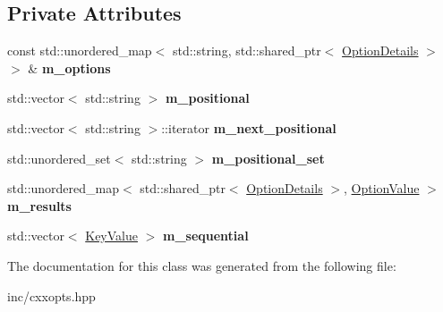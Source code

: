 \subsection*{Private Attributes}
\begin{DoxyCompactItemize}
\item 
const std\+::unordered\+\_\+map$<$ std\+::string, std\+::shared\+\_\+ptr$<$ \hyperlink{classcxxopts_1_1OptionDetails}{Option\+Details} $>$ $>$ \& {\bfseries m\+\_\+options}\hypertarget{classcxxopts_1_1ParseResult_a83d56d2c1c32704ba5218db38058d3be}{}\label{classcxxopts_1_1ParseResult_a83d56d2c1c32704ba5218db38058d3be}

\item 
std\+::vector$<$ std\+::string $>$ {\bfseries m\+\_\+positional}\hypertarget{classcxxopts_1_1ParseResult_ae205cfc947baea06415e5d10185d68da}{}\label{classcxxopts_1_1ParseResult_ae205cfc947baea06415e5d10185d68da}

\item 
std\+::vector$<$ std\+::string $>$\+::iterator {\bfseries m\+\_\+next\+\_\+positional}\hypertarget{classcxxopts_1_1ParseResult_aff5049a94be37481efb60cf1bb0ad91d}{}\label{classcxxopts_1_1ParseResult_aff5049a94be37481efb60cf1bb0ad91d}

\item 
std\+::unordered\+\_\+set$<$ std\+::string $>$ {\bfseries m\+\_\+positional\+\_\+set}\hypertarget{classcxxopts_1_1ParseResult_a4f3614bf3ba75fbeab82970a8689e06c}{}\label{classcxxopts_1_1ParseResult_a4f3614bf3ba75fbeab82970a8689e06c}

\item 
std\+::unordered\+\_\+map$<$ std\+::shared\+\_\+ptr$<$ \hyperlink{classcxxopts_1_1OptionDetails}{Option\+Details} $>$, \hyperlink{classcxxopts_1_1OptionValue}{Option\+Value} $>$ {\bfseries m\+\_\+results}\hypertarget{classcxxopts_1_1ParseResult_a98c407f6f23da9c83b4ed2407321b169}{}\label{classcxxopts_1_1ParseResult_a98c407f6f23da9c83b4ed2407321b169}

\item 
std\+::vector$<$ \hyperlink{classcxxopts_1_1KeyValue}{Key\+Value} $>$ {\bfseries m\+\_\+sequential}\hypertarget{classcxxopts_1_1ParseResult_ab9d7bcfd12003cd06bddd374b364a0ec}{}\label{classcxxopts_1_1ParseResult_ab9d7bcfd12003cd06bddd374b364a0ec}

\end{DoxyCompactItemize}


The documentation for this class was generated from the following file\+:\begin{DoxyCompactItemize}
\item 
inc/cxxopts.\+hpp\end{DoxyCompactItemize}
